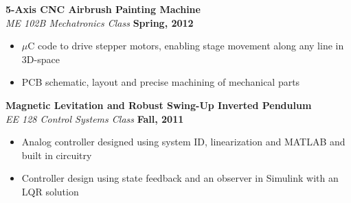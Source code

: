 \documentclass[margin,line]{resume}
\begin{document}
\begin{resume}

    \textbf{5-Axis CNC Airbrush Painting Machine}\\
    \textsl{ME 102B Mechatronics Class} \hfill \textbf{Spring, 2012}\\ \vspace{-4mm}
    \begin{itemize} \itemsep -2pt
    	\item $\mu$C code to drive stepper motors, enabling stage movement along any line in 3D-space
    	\item PCB schematic, layout and precise machining of mechanical parts
    \end{itemize} \vspace{-2.25mm}


    \textbf{Magnetic Levitation and Robust Swing-Up Inverted Pendulum}\\
    \textsl{EE 128 Control Systems Class} \hfill \textbf{Fall, 2011}\\ \vspace{-4mm}
    \begin{itemize} \itemsep -2pt
    	\item Analog controller designed using system ID, linearization and MATLAB and built in circuitry
        \item Controller design using state feedback and an observer in Simulink with an LQR solution
    \end{itemize} \vspace{-2.25mm}


\end{resume}
\end{document}
